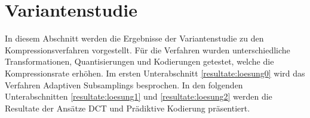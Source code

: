 \section{Variantenstudie}\label{resultate}
In diesem Abschnitt werden die Ergebnisse der Variantenstudie zu den Kompressionsverfahren vorgestellt. Für die Verfahren wurden unterschiedliche Transformationen, Quantisierungen und Kodierungen getestet, welche die Kompressionsrate erhöhen. Im ersten Unterabschnitt \ref{resultate:loesung0} wird das Verfahren Adaptiven Subsamplings besprochen. In den folgenden Unterabschnitten \ref{resultate:loesung1} und \ref{resultate:loesung2} werden die Resultate der Ansätze DCT und Prädiktive Kodierung präsentiert.


\pagebreak

\pagebreak

